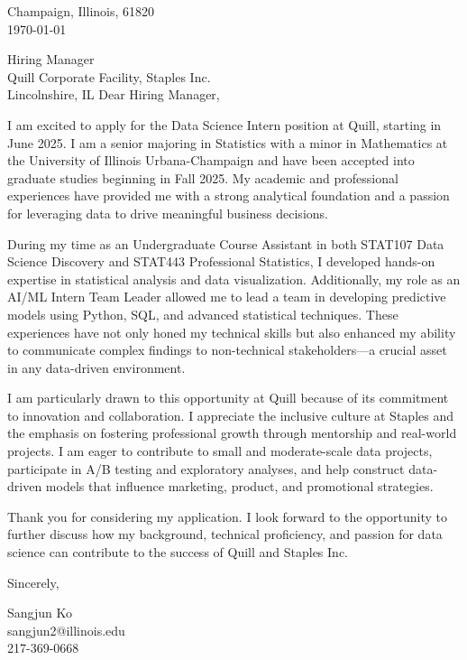 \documentclass[11pt]{article}
\begin{document}
\noindent
Champaign, Illinois, 61820 \\
\today
\vspace{2em}

\noindent
Hiring Manager\\
Quill Corporate Facility, Staples Inc.\\
Lincolnshire, IL
\vspace{1.5em}
Dear Hiring Manager,

I am excited to apply for the Data Science Intern position at Quill, starting in June 2025. I am a senior majoring in Statistics with a minor in Mathematics at the University of Illinois Urbana-Champaign and have been accepted into graduate studies beginning in Fall 2025. My academic and professional experiences have provided me with a strong analytical foundation and a passion for leveraging data to drive meaningful business decisions.

During my time as an Undergraduate Course Assistant in both STAT107 Data Science Discovery and STAT443 Professional Statistics, I developed hands-on expertise in statistical analysis and data visualization. Additionally, my role as an AI/ML Intern Team Leader allowed me to lead a team in developing predictive models using Python, SQL, and advanced statistical techniques. These experiences have not only honed my technical skills but also enhanced my ability to communicate complex findings to non-technical stakeholders—a crucial asset in any data-driven environment.

I am particularly drawn to this opportunity at Quill because of its commitment to innovation and collaboration. I appreciate the inclusive culture at Staples and the emphasis on fostering professional growth through mentorship and real-world projects. I am eager to contribute to small and moderate-scale data projects, participate in A/B testing and exploratory analyses, and help construct data-driven models that influence marketing, product, and promotional strategies.

Thank you for considering my application. I look forward to the opportunity to further discuss how my background, technical proficiency, and passion for data science can contribute to the success of Quill and Staples Inc.
\vspace{1em}

Sincerely,

\vspace{2em}

\noindent
Sangjun Ko\\
sangjun2@illinois.edu\\
217-369-0668
\end{document}
